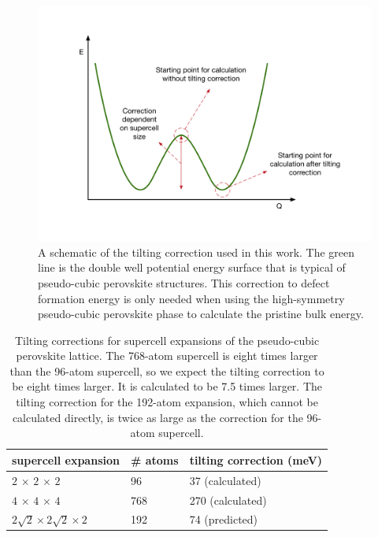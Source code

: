 \begin{figure}[h!]   
\centering
  \includegraphics[width=0.8\columnwidth]{figures/ch6/tilting_correction.png}
  \caption[Tilting correction for the pseudo-cubic perovskite lattice]{A schematic of the tilting correction used in this work. The green line is the double well potential energy surface that is typical of pseudo-cubic perovskite structures. This correction to defect formation energy is only needed when using the high-symmetry pseudo-cubic perovskite phase to calculate the pristine bulk energy.}
\label{tilting_correction}
\end{figure}

\begin{table}[h!]\centering
\begin{tabular}{lll}\toprule
supercell expansion&\# atoms&tilting correction (meV) \\ 
\midrule
$2\,\times\,2\,\times\,2$ & 96 & 37 (calculated) \\
$4\,\times\,4\,\times\,4$ & 768 & 270 (calculated) \\
$2\sqrt2\times2\sqrt2\times2$ & 192 & 74 (predicted) \\
\bottomrule
\end{tabular} 
\caption[Tilting corrections for supercell expansions of the pseudo-cubic perovskite lattice]{\label{modemaptable} Tilting corrections for supercell expansions of the pseudo-cubic perovskite lattice. The 768-atom supercell is eight times larger than the 96-atom supercell, so we expect the tilting correction to be eight times larger. It is calculated to be 7.5 times larger. The tilting correction for the 192-atom expansion, which cannot be calculated directly, is twice as large as the correction for the 96-atom supercell. }
\end{table}

